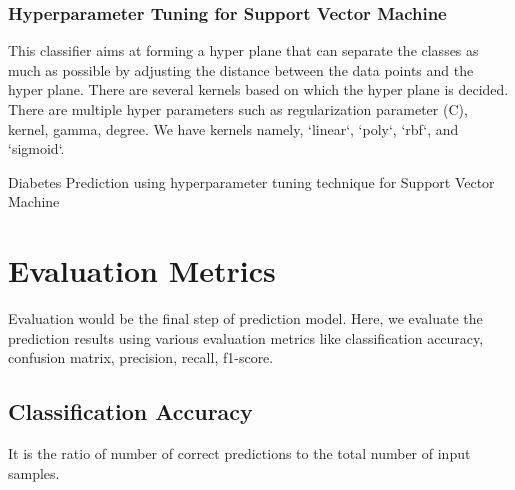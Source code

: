 \subsubsection{Hyperparameter Tuning for Support Vector Machine}
This classifier aims at forming a hyper plane that can separate the classes as much as possible by adjusting the 
distance between the data points and the hyper plane. There are several kernels based on which the hyper plane is decided. There are multiple hyper parameters such as regularization parameter (C), kernel, gamma, degree.  We have kernels namely, `linear`, `poly`, `rbf`, and `sigmoid`. 
\begin{algorithm}
    \caption{Diabetes Prediction using hyperparameter tuning technique for Support Vector Machine}
    \label{algo:algo_hp_svm}
    \begin{algorithmic}[1]
        \Statex
    \end{algorithmic}
\end{algorithm}

\section{Evaluation Metrics}
Evaluation would be the final step of prediction model. Here, we evaluate the prediction results using various evaluation metrics like classification accuracy, confusion matrix, precision, recall, f1-score.

\subsection{Classification Accuracy}
It is the ratio of number of correct predictions to the total number of input samples. 

